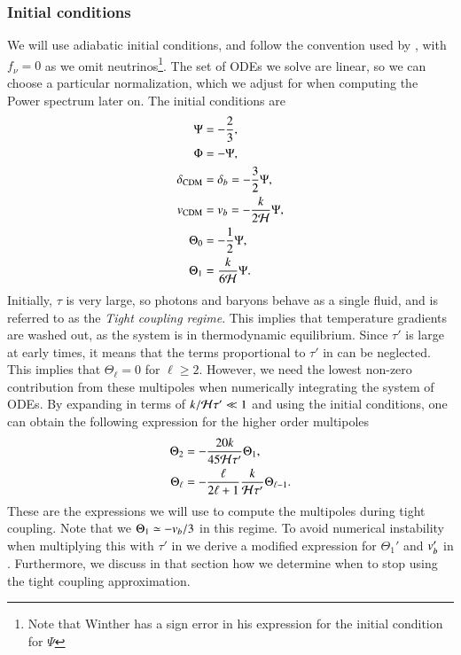 \subsubsection{Initial conditions} \label{sssec:M3:theory:initial_conditions}
We will use adiabatic initial conditions, and follow the convention used by \cite{winther}, with $f_\nu=0$ as we omit neutrinos\footnote{Note that Winther has a sign error in his expression for the initial condition for $\Psi$}. The set of ODEs we solve are linear, so we can choose a particular normalization, which we adjust for when computing the Power spectrum later on. The initial conditions are      
\begin{subequations} \label{eq:M3:theory:pert_ODE_IC}
    \begin{align}
        \Psi &= -\frac{2}{3}, \label{eq:M3:theory:pert_ODE_IC_Psi} \\
        \Phi &= - \Psi, \label{eq:M3:theory:pert_ODE_IC_Phi} \\
        \delta_\mathrm{CDM} &= \delta_b = -\frac{3}{2}\Psi, \label{eq:M3:theory:pert_ODE_IC_delta_cdm} \\
        v_\mathrm{CDM} &= v_b = -\frac{k}{2\mathcal{H}} \Psi, \label{eq:M3:theory:pert_ODE_IC_v_cdm} \\
        \Theta_0 &= -\frac{1}{2}\Psi, \label{eq:M3:theory:pert_ODE_IC_Theta0} \\
        \Theta_1 &= \frac{k}{6\mathcal{H}}\Psi. \label{eq:M3:theory:pert_ODE_IC_Theta1} 
    \end{align}
\end{subequations}
Initially, $\tau$ is very large, so photons and baryons behave as a single fluid, and is referred to as the \textit{Tight coupling regime}. This implies that temperature gradients are washed out, as the system is in thermodynamic equilibrium. Since $\tau'$ is large at early times, it means that the terms proportional to $\tau'$ in  can be neglected. This implies that $\Theta_\ell=0$ for $\ell\geq2$. However, we need the lowest non-zero contribution from these multipoles when numerically integrating the system of ODEs. By expanding in terms of $k/\mathcal{H}\tau'\ll1$ and using the initial conditions, one can obtain the following expression for the higher order multipoles
\begin{subequations} \label{eq:M3:theory:IC_Thetas}
    \begin{align}
        \Theta_2 &= - \frac{20k}{45\mathcal{H}\tau'}\Theta_1, \label{eq:M3:theory:IC_Theta2} \\
        \Theta_\ell &= - \frac{\ell}{2\ell+1} \frac{k}{\mathcal{H}\tau'}\Theta_{\ell-1} \label{eq:M3:theory:IC_Theta_ell}. 
    \end{align}
\end{subequations}
These are the expressions we will use to compute the multipoles during tight coupling. Note that we $\Theta_1\simeq-v_b/3$ in this regime. To avoid numerical instability when multiplying this with $\tau'$ in  we derive a modified expression for $\Theta_1'$ and $v_b'$ in . Furthermore, we discuss in that section how we determine when to stop using the tight coupling approximation. 





